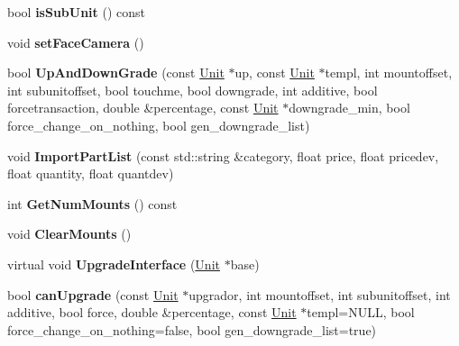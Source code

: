 \begin{DoxyCompactItemize}
\item 
bool {\bfseries is\+Sub\+Unit} () const \hypertarget{classUnit_a24771cc2268d2f9c44484c46940cbeda}{}\label{classUnit_a24771cc2268d2f9c44484c46940cbeda}

\item 
void {\bfseries set\+Face\+Camera} ()\hypertarget{classUnit_a763f0467bebd4537ec3826c90626a1ec}{}\label{classUnit_a763f0467bebd4537ec3826c90626a1ec}

\item 
bool {\bfseries Up\+And\+Down\+Grade} (const \hyperlink{classUnit}{Unit} $\ast$up, const \hyperlink{classUnit}{Unit} $\ast$templ, int mountoffset, int subunitoffset, bool touchme, bool downgrade, int additive, bool forcetransaction, double \&percentage, const \hyperlink{classUnit}{Unit} $\ast$downgrade\+\_\+min, bool force\+\_\+change\+\_\+on\+\_\+nothing, bool gen\+\_\+downgrade\+\_\+list)\hypertarget{classUnit_a3e1f34f0d01c62a9044bea9146af0c3e}{}\label{classUnit_a3e1f34f0d01c62a9044bea9146af0c3e}

\item 
void {\bfseries Import\+Part\+List} (const std\+::string \&category, float price, float pricedev, float quantity, float quantdev)\hypertarget{classUnit_a4866ae1c5ee0e5fa1c1d510694a3d15f}{}\label{classUnit_a4866ae1c5ee0e5fa1c1d510694a3d15f}

\item 
int {\bfseries Get\+Num\+Mounts} () const \hypertarget{classUnit_a433d1f418cd6cd3a9b09b6da3ae2b975}{}\label{classUnit_a433d1f418cd6cd3a9b09b6da3ae2b975}

\item 
void {\bfseries Clear\+Mounts} ()\hypertarget{classUnit_ae2b82d9e89aef582b8a25a6d6c63eaca}{}\label{classUnit_ae2b82d9e89aef582b8a25a6d6c63eaca}

\item 
virtual void {\bfseries Upgrade\+Interface} (\hyperlink{classUnit}{Unit} $\ast$base)\hypertarget{classUnit_a6b398ef7db52101c4b61be50f1b80d61}{}\label{classUnit_a6b398ef7db52101c4b61be50f1b80d61}

\item 
bool {\bfseries can\+Upgrade} (const \hyperlink{classUnit}{Unit} $\ast$upgrador, int mountoffset, int subunitoffset, int additive, bool force, double \&percentage, const \hyperlink{classUnit}{Unit} $\ast$templ=N\+U\+LL, bool force\+\_\+change\+\_\+on\+\_\+nothing=false, bool gen\+\_\+downgrade\+\_\+list=true)\hypertarget{classUnit_abab7ff5e88ec58d00a6ab967168b4360}{}\label{classUnit_abab7ff5e88ec58d00a6ab967168b4360}


\end{DoxyCompactItemize}
